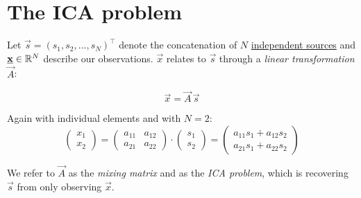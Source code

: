 
\section{The ICA problem}

\begin{frame}{\secname}

Let $\vec s = (s_1, s_2,...,s_N)^\top$ denote the concatenation of $N$ \underline{independent sources} 
and $\underline{\mathbf{x}} \in \mathbb{R}^N$ describe our observations. $\vec x$ relates to $\vec s$ through a 
\emph{linear transformation} $\vec A$:

\begin{equation}
\label{eq:ica}
\vec x = \vec A \, \vec s
\end{equation}

Again with individual elements and with $N=2$:
\begin{equation}
 \left( \begin{array}{ll}
			x_1 \\ x_2
		\end{array} \right)
        = \left( \begin{array}{ll}
			a_{11} & a_{12} \\ a_{21} & a_{22}
		\end{array} \right) \cdot \left( \begin{array}{ll}
			s_1 \\ s_2
		\end{array} \right)
	= \left( \begin{array}{l}
		a_{11} s_1 + a_{12} s_2 \\ a_{21} s_1 + a_{22} s_2
	\end{array} \right)
\end{equation}

We refer to $\vec A$ as the \emph{mixing matrix} and \notesonly{\eqref{eq:ica}} as the \emph{ICA problem}, 
which is recovering $\vec s$ from only observing $\vec x$.

\end{frame}

